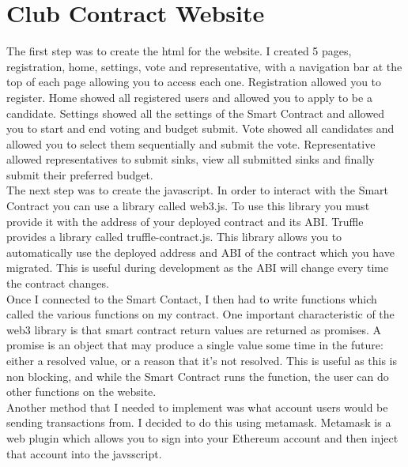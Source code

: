 \section{Club Contract Website}
The first step was to create the html for the website. I created 5 pages, registration, home, settings, vote and representative, with a navigation bar at the top of each page allowing you to access each one. Registration allowed you to register. Home showed all registered users and allowed you to apply to be a candidate. Settings showed all the settings of the Smart Contract and allowed you to start and end voting and budget submit. Vote showed all candidates and allowed you to select them sequentially and submit the vote. Representative allowed representatives to submit sinks, view all submitted sinks and finally submit their preferred budget. \\
 The next step was to create the javascript. In order to interact with the Smart Contract you can use a library called web3.js. To use this library you must provide it with the address of your deployed contract and its ABI. Truffle provides a library called truffle-contract.js. This library allows you to automatically use the deployed address and ABI of the contract which you have migrated. This is useful during development  as the ABI will change every time the contract changes. \\
Once I connected to the Smart Contact, I then had to write functions which called the various functions on my contract. One important characteristic of the web3 library is that smart contract return values are returned as promises. A promise is an object that may produce a single value some time in the future: either a resolved value, or a reason that it’s not resolved. This is useful as this is non blocking, and while the Smart Contract runs the function, the user can do other functions on the website. \\
Another method that I needed to implement was what account users would be sending transactions from. I decided to do this using metamask. Metamask is a web plugin which allows you to sign into your Ethereum account and then inject that account into the javsscript.